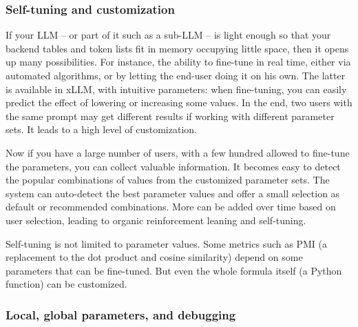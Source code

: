 \documentclass[10pt]{article}
\begin{document}
{%

\subsubsection{Self-tuning and customization}

If your LLM -- or part of it such as a sub-LLM -- is light enough so that your backend tables and token lists fit in memory occupying little space, then it opens up many 
 possibilities. For instance, the ability to fine-tune in real time, either via automated algorithms, or by letting the end-user doing it on his own. The latter is available in xLLM, with intuitive parameters: when fine-tuning, you can easily predict the effect of lowering or increasing some values. In the end, two users with the same prompt may get different results
 if working with different parameter sets. It leads to a high level of \textcolor{index}{customization}.   

Now if you have a large number of users, with a few hundred allowed to fine-tune the parameters, 
you can collect valuable information. It becomes easy to detect the popular combinations of values 
from the customized parameter sets. The system can auto-detect the best parameter values and offer a small
 selection as default or recommended combinations. More can be added over time based on user selection,
 leading to organic \textcolor{index}{reinforcement leaning} and 
\textcolor{index}{self-tuning}.    

Self-tuning is not limited to parameter values. Some metrics such as 
\textcolor{index}{PMI} (a replacement to the dot product and cosine similarity)
 depend on some parameters that can be fine-tuned. But even the whole formula itself (a Python function) can be customized. 


\subsubsection{Local, global parameters, and debugging}

}
\end{document}
